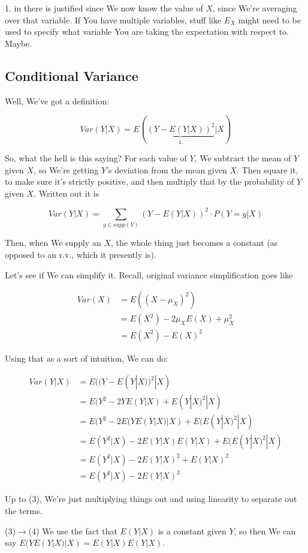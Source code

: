 \documentclass{article}
\begin{document}
		1. in there is justified since We now know the value of $X$, since We're averaging over that variable. If You have multiple variables, stuff like $E_X$ might need to be used to specify what variable You are taking the expectation with respect to. Maybe.
		
	\subsection{Conditional Variance}
	
		Well, We've got a definition:
		
		\[ Var(Y|X) = E(\underbrace{(Y-E(Y|X))^2}_{1.}|X) \]			
			
		So, what the hell is this saying? For each value of $Y$, We subtract the mean of $Y$ given $X$, so We're getting $Y$'s deviation from the mean given $X$. Then square it, to make sure it's strictly positive, and then multiply that by the probability of $Y$ given $X$. Written out it is
		
		\[ Var(Y|X) = \sum_{y\in supp(Y)} (Y-E(Y|X))^2\cdot P(Y=y|X) \]
			
		Then, when We supply an $X$, the whole thing just becomes a constant (as opposed to an r.v., which it presently is).
		
		Let's see if We can simplify it. Recall, original variance simplification goes like
		
		\begin{align*}
		Var(X) &= E((X-\mu_X)^2) \\
		&= E(X^2) - 2\mu_X E(X) + \mu_X^2\\
		&= E(X^2) - E(X)^2
		\end{align*}
		
		Using that as a sort of intuition, We can do:
		
		\begin{align}
		 Var(Y|X) &= E((Y-E(Y|X))^2|X)\\
		 &= E(Y^2 - 2YE(Y|X) + E(Y|X)^2  |X)\\
		 &= E(Y^2 - 2E(YE(Y|X)|X) + E(E(Y|X)^2|X)  \\
		 &= E(Y^2|X) -2E(Y|X)E(Y|X) + E(E(Y|X)^2|X) \\
		 &= E(Y^2|X) - 2E(Y|X)^2 + E(Y|X)^2\\
		 &=E(Y^2|X) - 2E(Y|X)^2
		\end{align}
			
		Up to (3), We're just multiplying things out and using linearity to separate out the terms.
		
		(3)$\to$(4) We use the fact that $E(Y|X)$ is a constant given $Y$, so then We can say $E(YE(Y|X)|X) = E(Y|X)E(Y|X)$.
		
\end{document}
